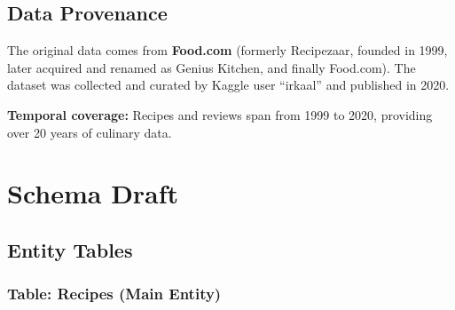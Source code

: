 \documentclass[11pt,a4paper]{article}
\begin{document}
\subsection{Data Provenance}

The original data comes from \textbf{Food.com} (formerly Recipezaar, founded in 1999, later acquired and renamed as Genius Kitchen, and finally Food.com). The dataset was collected and curated by Kaggle user ``irkaal'' and published in 2020.

\textbf{Temporal coverage:} Recipes and reviews span from 1999 to 2020, providing over 20 years of culinary data.

\section{Schema Draft}

\subsection{Entity Tables}

\subsubsection{Table: Recipes (Main Entity)}
\end{document}
